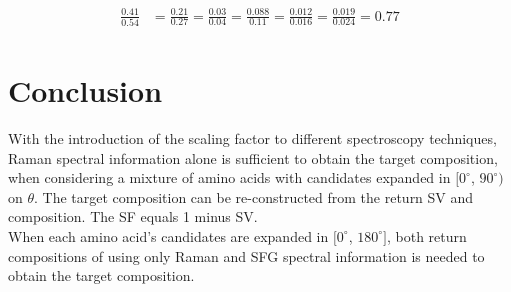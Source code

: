 \begin{eqnarray} 
\begin{split}
\frac{0.41}{0.54} &= \frac{0.21}{0.27} = \frac{0.03}{0.04}  =\frac{0.088}{0.11} = \frac{0.012}{0.016} = \frac{0.019}{0.024} = 0.77
\end{split}\label{eqn:6.2}
\end{eqnarray}

\section{Conclusion}

With the introduction of the scaling factor to different spectroscopy techniques, Raman spectral information alone is sufficient to obtain the target composition, when considering a mixture of amino acids with candidates expanded in $[0^{\circ}$, $90^{\circ})$ on $\theta$. The target composition can be re-constructed from the return SV and composition. The SF equals 1 minus SV. \\

When each amino acid's candidates are expanded in $[0^{\circ}$, $180^{\circ}]$, both return compositions of using only Raman and SFG spectral information is needed to obtain the target composition.  \\
